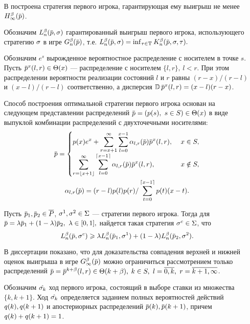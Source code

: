 В  построена стратегия первого игрока, гарантирующая ему выигрыш не менее $\H{\infty}(\p)$.

Обозначим $\L{n}(\p, \sigmar)$ гарантированный выигрыш первого игрока, использующего стратегию $\sigma$ в игре $\theG{n}(\p)$, т.е.
$
  \L{n}(\p, \sigmar) = \inf_{\taur \in \Tau} \K{n}(\p, \sigmar, \taur).
$

Обозначим $e^s$ вырожденное вероятностное распределение с носителем в точке $s$.
Пусть $\pd^x(l, r) \in \Theta(x)$ --- распределение с носителем $\{l, r\},\ l<r$.
При этом распределении вероятности реализации состояний $l$ и $r$ равны $(r-x)/(r-l)$ и $(x-l)/(r-l)$ соответственно, а дисперсия
$\D \pd^x(l, r) = (x - l)(r - x)$.

Способ построения оптимальной стратегии первого игрока основан на следующем представлении распределений $\pd = (\pc{s},\ s \in S) \in \Theta(x)$ в виде выпуклой комбинации распределений с двухточечными носителями:
\begin{gather}
  \label{ch2:lower-bound:eq:prob-decomp-sum}
  \pd = \begin{cases}
    \displaystyle
    \pc{x} e^x + \sum_{r=x+1}^\infty \sum_{l=0}^{x-1} \alpha_{l,r}(\pd) \pd^x(l, r),\ & x \in S,\\
    \displaystyle
    \sum_{r=\floor{x+1}}^\infty \sum_{l=0}^{\ceil{x-1}} \alpha_{l,r}(\pd) \pd^x(l, r),\ & x \notin S,\\
  \end{cases}\\
  \alpha_{l,r}(\pd) = (r-l) \pc{l} \pc{r} / \sum_{t=0}^{\ceil{x-1}} \pc{t} (x-t). \nonumber
\end{gather}
\begin{lemma}
  \label{ch2:lower-bound:lemma:convex-combination}
  Пусть $\pd_1, \pd_2 \in \MM$, $\sigma^1, \sigma^2 \in \Sigma$ --- стратегии первого игрока.
  Тогда для $\pd = \lambda \pd_1 + (1-\lambda) \pd_2,\ \lambda \in [0, 1],$ найдется такая стратегия $\sigma^c \in \Sigma$, что
  \[
    \L{n}(\pd, \sigmar^c) \geqslant
    \lambda \L{n}(\pd_1, \sigmar^1) + (1-\lambda) \L{n}(\pd_2, \sigmar^2).
  \]
\end{lemma}

В диссертации показано, что для доказательства совпадения верхней и нижней оценок выигрыша в игре $\theG{\infty}(\pd)$ можно ограничиться рассмотрением только распределений %
$\pd = \pd^{k+\beta}(l, r) \in \Theta(k + \beta), \; k \in S,\ l = \overline{0, k},\ r = \overline{k+1, \infty}$.

Обозначим $\hat{\sigma_k}$ ход первого игрока, состоящий в выборе ставки из множества $\{k, k+1\}$.
Ход $\hat{\sigma_k}$ определяется заданием полных вероятностей действий $q(k), q(k+1)$ и апостериорных распределений $\pad{k}, \pad{k+1}$, причем $q(k) + q(k+1) = 1$.

